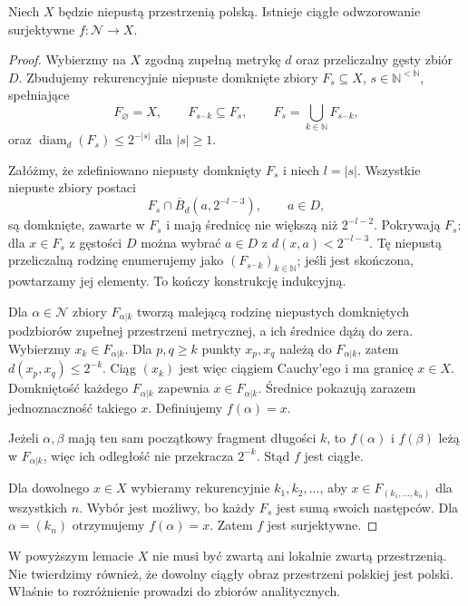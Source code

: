 \begin{lemat}
\label{lem:topog20-surjection}
Niech \(X\) będzie niepustą przestrzenią
polską. Istnieje ciągłe odwzorowanie
surjektywne \(f\colon\mathcal N\to X\).
\end{lemat}
\begin{proof}
Wybierzmy na \(X\) zgodną zupełną
metrykę \(d\) oraz przeliczalny
gęsty zbiór \(D\).
Zbudujemy rekurencyjnie niepuste
domknięte zbiory \(F_s\subseteq X\),
\(s\in\mathbb N^{<\mathbb N}\),
spełniające
\[
 F_{\varnothing}=X,\qquad
 F_{s^\frown k}\subseteq F_s,\qquad
 F_s=\bigcup_{k\in\mathbb N}F_{s^\frown k},
\]
oraz
\(\operatorname{diam}_d(F_s)\le2^{-|s|}\)
dla \(|s|\ge1\).

Załóżmy, że zdefiniowano
niepusty domknięty \(F_s\)
i niech \(l=|s|\).
Wszystkie niepuste zbiory postaci
\[
 F_s\cap\overline B_d(a,2^{-l-3}),
 \qquad a\in D,
\]
są domknięte, zawarte w \(F_s\)
i mają średnicę nie większą
niż \(2^{-l-2}\).
Pokrywają \(F_s\): dla \(x\in F_s\)
z gęstości \(D\) można wybrać
\(a\in D\) z \(d(x,a)<2^{-l-3}\).
Tę niepustą przeliczalną rodzinę
enumerujemy jako
\((F_{s^\frown k})_{k\in\mathbb N}\);
jeśli jest skończona,
powtarzamy jej elementy.
To kończy konstrukcję indukcyjną.

Dla \(\alpha\in\mathcal N\)
zbiory \(F_{\alpha|k}\)
tworzą malejącą rodzinę
niepustych domkniętych
podzbiorów zupełnej przestrzeni
metrycznej, a ich średnice
dążą do zera.
Wybierzmy \(x_k\in F_{\alpha|k}\).
Dla \(p,q\ge k\) punkty
\(x_p,x_q\) należą do
\(F_{\alpha|k}\), zatem
\(d(x_p,x_q)\le2^{-k}\).
Ciąg \((x_k)\) jest więc
ciągiem Cauchy'ego i ma
granicę \(x\in X\).
Domkniętość każdego
\(F_{\alpha|k}\) zapewnia
\(x\in F_{\alpha|k}\).
Średnice pokazują zarazem
jednoznaczność takiego \(x\).
Definiujemy \(f(\alpha)=x\).

Jeżeli \(\alpha,\beta\)
mają ten sam początkowy
fragment długości \(k\), to
\(f(\alpha)\) i \(f(\beta)\)
leżą w \(F_{\alpha|k}\),
więc ich odległość
nie przekracza \(2^{-k}\).
Stąd \(f\) jest ciągłe.

Dla dowolnego \(x\in X\)
wybieramy rekurencyjnie
\(k_1,k_2,\ldots\), aby
\(x\in F_{(k_1,\ldots,k_n)}\)
dla wszystkich \(n\).
Wybór jest możliwy, bo
każdy \(F_s\) jest sumą
swoich następców.
Dla \(\alpha=(k_n)\)
otrzymujemy \(f(\alpha)=x\).
Zatem \(f\) jest surjektywne.
\end{proof}

\begin{uwaga}
\label{rem:topog20-param}
W powyższym lemacie \(X\)
nie musi być zwartą ani
lokalnie zwartą przestrzenią.
Nie twierdzimy również,
że dowolny ciągły obraz
przestrzeni polskiej jest polski.
Właśnie to rozróżnienie
prowadzi do zbiorów analitycznych.
\end{uwaga}


